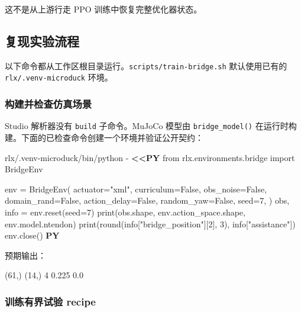 \documentclass[
  chinese,
  11pt,
  letterpaper,
]{article}
\newenvironment{Shaded}{\begin{snugshade}}{\end{snugshade}}
\newcommand{\AttributeTok}[1]{\textcolor[rgb]{0.13,0.29,0.53}{#1}}
\newcommand{\ExtensionTok}[1]{#1}
\newcommand{\NormalTok}[1]{#1}
\newcommand{\OperatorTok}[1]{\textcolor[rgb]{0.81,0.36,0.00}{\textbf{#1}}}
\newcommand{\StringTok}[1]{\textcolor[rgb]{0.31,0.60,0.02}{#1}}
\renewenvironment{Shaded}{\par\smallskip}{\par\smallskip}
\begin{document}
\endgroup

这不是从上游行走 PPO 训练中恢复完整优化器状态。

\subsection{复现实验流程}\label{ux590dux73b0ux5b9eux9a8cux6d41ux7a0b}

以下命令都从工作区根目录运行。\texttt{scripts/\allowbreak{}train-\allowbreak{}bridge.s\allowbreak{}h}
默认使用已有的
\texttt{rlx/\allowbreak{}.venv-\allowbreak{}microduc\allowbreak{}k}
环境。

\subsubsection{构建并检查仿真场景}\label{ux6784ux5efaux5e76ux68c0ux67e5ux4effux771fux573aux666f}

Studio 解析器没有 \texttt{build} 子命令。MuJoCo 模型由
\texttt{bridge\_model()}
在运行时构建。下面的已检查命令创建一个环境并验证公开契约：

\begin{Shaded}
\begin{Highlighting}[]
\ExtensionTok{rlx/.venv{-}microduck/bin/python} \AttributeTok{{-}} \OperatorTok{\textless{}\textless{}\textquotesingle{}PY\textquotesingle{}}
\StringTok{from rlx.environments.bridge import BridgeEnv}

\StringTok{env = BridgeEnv(}
\StringTok{    actuator="xml",}
\StringTok{    curriculum=False,}
\StringTok{    obs\_noise=False,}
\StringTok{    domain\_rand=False,}
\StringTok{    action\_delay=False,}
\StringTok{    random\_yaw=False,}
\StringTok{    seed=7,}
\StringTok{)}
\StringTok{obs, info = env.reset(seed=7)}
\StringTok{print(obs.shape, env.action\_space.shape, env.model.ntendon)}
\StringTok{print(round(info["bridge\_position"][2], 3), info["assistance"])}
\StringTok{env.close()}
\OperatorTok{PY}
\end{Highlighting}
\end{Shaded}

预期输出：

\begin{Shaded}
\begin{Highlighting}[]
\NormalTok{(61,) (14,) 4}
\NormalTok{0.225 0.0}
\end{Highlighting}
\end{Shaded}

\subsubsection{训练有界试验
recipe}\label{ux8badux7ec3ux6709ux754cux8bd5ux9a8c-recipe}
\end{document}
